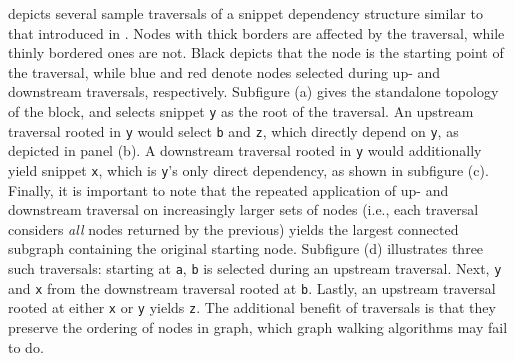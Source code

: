  depicts several sample traversals of a
snippet dependency structure similar to that introduced in .
Nodes with thick borders are affected by the traversal, while thinly bordered ones are not.
Black depicts that the node is the starting point of the traversal,
while blue and red denote nodes selected during up- and downstream traversals, respectively.
Subfigure (a) gives the standalone topology of the block, and selects
snippet \texttt{y} as the root of the traversal.
An upstream traversal rooted in \texttt{y} would select \texttt{b} and \texttt{z},
which directly depend on \texttt{y}, as depicted in panel (b).
A downstream traversal rooted in \texttt{y} would additionally yield
snippet \texttt{x}, which is \texttt{y}'s only direct dependency, as shown in 
subfigure (c).
Finally, it is important to note that the repeated application of up- and downstream
traversal on increasingly larger sets of nodes (i.e., each traversal considers \textit{all}
nodes returned by the previous) yields the largest connected subgraph containing the
original starting node.
Subfigure (d) illustrates three such traversals:
starting at \texttt{a}, \texttt{b} is selected during an upstream traversal.
Next, \texttt{y} and \texttt{x} from the downstream traversal rooted at \texttt{b}.
Lastly, an upstream traversal rooted at either \texttt{x} or \texttt{y} yields \texttt{z}.
The additional benefit of traversals is that they preserve
the ordering of nodes in graph, which graph walking algorithms may fail to do.

